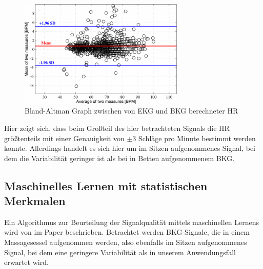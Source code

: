 	\begin{figure}[H]
		\centering
		\includegraphics[width=0.7\textwidth]{pic/bland-altman-pino.png}
		\caption[Bland-Altman Graph zwischen von \ac{EKG} und \ac{BKG} berechneter \ac{HR}]{Bland-Altman Graph zwischen von \ac{EKG} und \ac{BKG} berechneter \ac{HR}}
		\label{fig:bland-altman-pino}
	\end{figure}
	
	Hier zeigt sich, dass beim Großteil des hier betrachteten Signals die \ac{HR} größtenteils mit einer Genauigkeit von $\pm 3$ Schläge pro Minute bestimmt werden konnte. Allerdings handelt es sich hier um im Sitzen aufgenommenes Signal, bei dem die Variabilität geringer ist als bei in Betten aufgenommenem \ac{BKG}.
	
	
	\subsection{Maschinelles Lernen mit statistischen Merkmalen}
	
	Ein Algorithmus zur Beurteilung der Signalqualität mittels maschinellen Lernens wird von \citeauthor{Sadek2016} im Paper  beschrieben. Betrachtet werden \ac{BKG}-Signale, die in einem Massagesessel aufgenommen werden, also ebenfalls im Sitzen aufgenommenes Signal, bei dem eine geringere Variabilität als in unserem Anwendungsfall erwartet wird.
	
